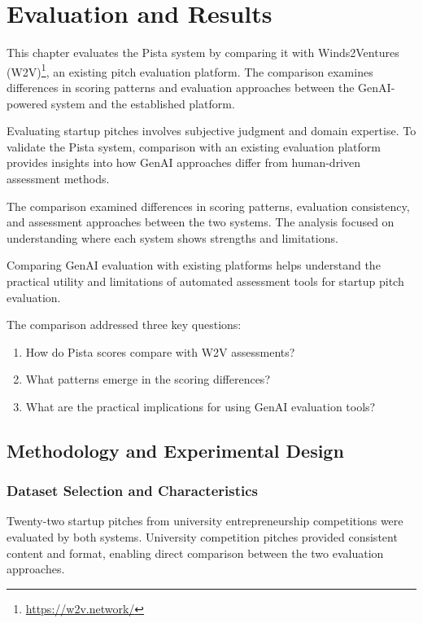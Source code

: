 \chapter{Evaluation and Results}
\label{ch:evaluation}

This chapter evaluates the Pista system by comparing it with Winds2Ventures (W2V)\footnote{\url{https://w2v.network/}}, an existing pitch evaluation platform. The comparison examines differences in scoring patterns and evaluation approaches between the GenAI-powered system and the established platform.

Evaluating startup pitches involves subjective judgment and domain expertise. To validate the Pista system, comparison with an existing evaluation platform provides insights into how GenAI approaches differ from human-driven assessment methods.

The comparison examined differences in scoring patterns, evaluation consistency, and assessment approaches between the two systems. The analysis focused on understanding where each system shows strengths and limitations.

Comparing GenAI evaluation with existing platforms helps understand the practical utility and limitations of automated assessment tools for startup pitch evaluation.

The comparison addressed three key questions:
\begin{enumerate}
    \item How do Pista scores compare with W2V assessments?
    \item What patterns emerge in the scoring differences?
    \item What are the practical implications for using GenAI evaluation tools?
\end{enumerate}

\section{Methodology and Experimental Design}
\label{sec:methodology}

\subsection{Dataset Selection and Characteristics}
\label{subsec:dataset}

Twenty-two startup pitches from university entrepreneurship competitions were evaluated by both systems. University competition pitches provided consistent content and format, enabling direct comparison between the two evaluation approaches.

